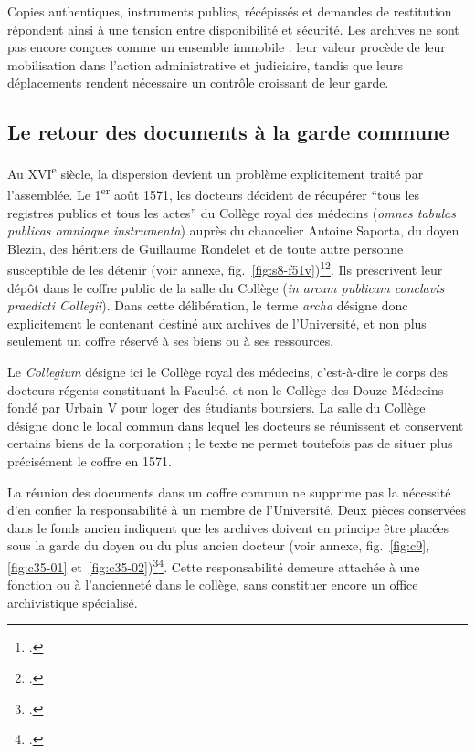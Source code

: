 Copies authentiques, instruments publics, récépissés et demandes de restitution répondent ainsi à une tension entre disponibilité et sécurité. Les archives ne sont pas encore conçues comme un ensemble immobile : leur valeur procède de leur mobilisation dans l'action administrative et judiciaire, tandis que leurs déplacements rendent nécessaire un contrôle croissant de leur garde.

\subsection{Le retour des documents à la garde commune}

Au XVI\textsuperscript{e} siècle, la dispersion devient un problème explicitement traité par l'assemblée. Le 1\textsuperscript{er} août 1571, les docteurs décident de récupérer \enquote{tous les registres publics et tous les actes} du Collège royal des médecins (\emph{omnes tabulas publicas omniaque instrumenta}) auprès du chancelier Antoine Saporta, du doyen Blezin, des héritiers de Guillaume Rondelet et de toute autre personne susceptible de les détenir (voir annexe, fig.~\ref{fig:s8-f51v})\footcite[fol.~51~v°]{AHFMS8}\footcite[p.~X, où Joseph Calmette donne la transcription du passage, vue~29 de la version numérisée]{CalmetteCartulaire1912}. Ils prescrivent leur dépôt dans le coffre public de la salle du Collège (\emph{in arcam publicam conclavis praedicti Collegii}). Dans cette délibération, le terme \emph{archa} désigne donc explicitement le contenant destiné aux archives de l'Université, et non plus seulement un coffre réservé à ses biens ou à ses ressources.

Le \emph{Collegium} désigne ici le Collège royal des médecins, c'est-à-dire le corps des docteurs régents constituant la Faculté, et non le Collège des Douze-Médecins fondé par Urbain V pour loger des étudiants boursiers. La salle du Collège désigne donc le local commun dans lequel les docteurs se réunissent et conservent certains biens de la corporation ; le texte ne permet toutefois pas de situer plus précisément le coffre en 1571.

La réunion des documents dans un coffre commun ne supprime pas la nécessité d'en confier la responsabilité à un membre de l'Université. Deux pièces conservées dans le fonds ancien indiquent que les archives doivent en principe être placées sous la garde du doyen ou du plus ancien docteur (voir annexe, fig.~\ref{fig:c9}, \ref{fig:c35-01} et~\ref{fig:c35-02})\footcite{AHFMC9}\footcite{AHFMC35}. Cette responsabilité demeure attachée à une fonction ou à l'ancienneté dans le collège, sans constituer encore un office archivistique spécialisé.

